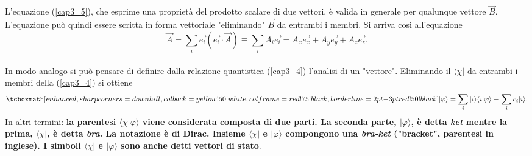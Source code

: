 \documentclass[a4paper,12pt,oneside]{book}
\begin{document}
L'equazione (\ref{cap3_5}), che esprime una proprietà del prodotto scalare di due vettori, è valida in generale per qualunque vettore $\vec{B}$. L'equazione può quindi essere scritta in forma vettoriale "eliminando" $\vec{B}$ da entrambi i membri. Si arriva così all'equazione 
	\begin{equation}
		\vec{A} = \sum \limits_{i} \vec{e_i} (\vec{e_i}\cdot\vec{A}) \equiv \sum \limits_{i} A_i\vec{e_i}= A_x\vec{e_x}+A_y\vec{e_y}+A_z\vec{e_z} .
	\end{equation}\\
	
In modo analogo si può pensare di definire dalla relazione quantistica (\ref{cap3_4}) l'analisi di un "vettore". Eliminando il $\langle \chi |$ da entrambi i membri della (\ref{cap3_4}) si ottiene
	\begin{equation}
		\tcboxmath[enhanced,sharp corners=downhill ,colback=yellow!50!white,colframe=red!75!black, borderline={2pt}{-3pt}{red!50!black}]{
 			| \varphi \rangle= \sum \limits_{i} | i \rangle \langle i | \varphi \rangle \equiv \sum \limits_{i} c_i | i \rangle .
 			}
	\label{cap3_8}
	\end{equation}
In altri termini: \textbf{la parentesi $\langle \chi | \varphi \rangle $ viene considerata composta di due parti. La seconda parte, $| \varphi \rangle $, è detta \emph{ket} mentre la prima, $\langle \chi |$, è detta \emph{bra}. La notazione è di Dirac. Insieme $\langle \chi |$ e $| \varphi \rangle$ compongono una \emph{bra-ket} ("bracket", parentesi in inglese). I simboli $\langle \chi |$ e $| \varphi \rangle$ sono anche detti vettori di stato}.\\
\end{document}
